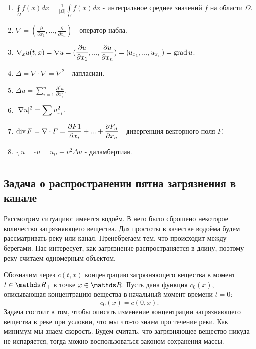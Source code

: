 \begin{enumerate}
\item $\displaystyle \fint \limits_{\Omega} f(x) dx = \frac{1}{|\Omega|} \int \limits_{\Omega} f(x) dx$ - интегральное среднее значений $f$ на области $\Omega$.
\item $\displaystyle \nabla = (\frac {\partial} {\partial x_1}, ... , \frac {\partial} {\partial x_n}) $ - оператор набла.
\item $\displaystyle \nabla_x u(t,x)  = \nabla u = (\frac {\partial u} {\partial x_1}, ..., \frac {\partial u} {\partial x_n}) = (u_{x_1}, ..., u_{x_n}) = \operatorname{grad} u $.
\item $\displaystyle \Delta = \nabla \cdot \nabla = \nabla^2$ - лапласиан.
\item $\displaystyle \Delta u = \sum \limits_{i=1}^n \frac {\partial^2 u} {\partial x_i^2}$.
\item $\displaystyle \lvert\nabla u\rvert^2 = \sum u_{x_i}^2$.
\item $\displaystyle \operatorname{div} F = \nabla \cdot F = \frac {\partial F1} {\partial x_i} + ... + \frac {\partial F_n} {\partial x_n}$ - дивергенция векторного поля $F$.
\item $\square_v u = \square u = u_{tt} - v^2 \Delta u$ - даламбертиан.

\end{enumerate}

\chapter{}
\section{Задача о распространении пятна загрязнения в канале}
Рассмотрим ситуацию: имеется водоём. В него было сброшено некоторое количество загрязняющего вещества.
Для простоты в качестве водоёма будем рассматривать реку или канал. Пренебрегаем тем, что происходит между берегами. Нас интересует, как загрязнение распространяется в длину, поэтому реку считаем одномерным объектом.

Обозначим через $c (t, x) $ концентрацию загрязняющего вещества в момент $t \in \real_+$ в точке $x \in \real$. Пусть дана функция $ c_0 (x) $, описывающая концентрацию вещества в начальный момент времени $ t = 0 $:
$$ c_0 (x) = c (0, x).$$
Задача состоит в том, чтобы описать изменение концентрации загрязняющего вещества в реке при условии, что мы что-то знаем про течение реки. Как минимум мы знаем скорость. Будем считать, что загрязняющее вещество никуда не испаряется, тогда можно воспользоваться законом сохранения массы.

